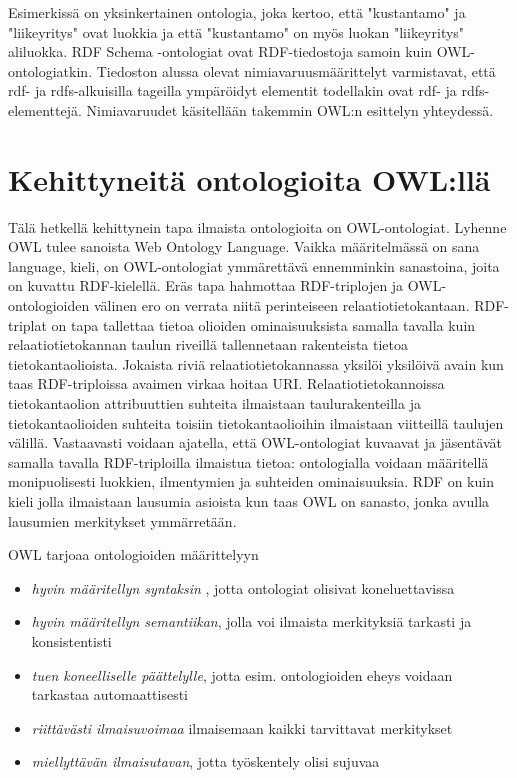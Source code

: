 \documentclass[finnish]{tktltiki2}
\theoremstyle{definition}
\theoremstyle{remark}
\begin{document}
Esimerkissä on yksinkertainen ontologia, joka kertoo, että "kustantamo" ja "liikeyritys" ovat luokkia ja että "kustantamo" on myös luokan "liikeyritys" aliluokka. RDF Schema  -ontologiat ovat RDF-tiedostoja samoin kuin OWL-ontologiatkin. Tiedoston alussa olevat nimiavaruusmäärittelyt varmistavat, että rdf- ja rdfs-alkuisilla tageilla ympäröidyt elementit todellakin ovat rdf- ja rdfs- elementtejä. Nimiavaruudet käsitellään takemmin OWL:n esittelyn yhteydessä. 

\section{Kehittyneitä ontologioita OWL:llä}



Tälä hetkellä kehittynein tapa ilmaista ontologioita on OWL-ontologiat. Lyhenne OWL tulee 
sanoista Web Ontology Language. Vaikka määritelmässä on sana language, kieli, on 
OWL-ontologiat ymmärettävä ennemminkin sanastoina, joita on kuvattu RDF-kielellä.
 Eräs tapa hahmottaa RDF-triplojen ja
OWL-ontologioiden välinen ero on verrata niitä perinteiseen
relaatiotietokantaan. RDF-triplat on tapa tallettaa tietoa olioiden ominaisuuksista samalla tavalla kuin
relaatiotietokannan taulun riveillä tallennetaan rakenteista tietoa tietokantaolioista. Jokaista riviä relaatiotietokannassa
yksilöi yksilöivä avain kun taas RDF-triploissa avaimen virkaa hoitaa URI. Relaatiotietokannoissa tietokantaolion attribuuttien suhteita ilmaistaan taulurakenteilla ja tietokantaolioiden suhteita toisiin tietokantaolioihin ilmaistaan viitteillä taulujen välillä. Vastaavasti voidaan ajatella, että OWL-ontologiat kuvaavat ja jäsentävät  samalla tavalla RDF-triploilla ilmaistua tietoa: ontologialla voidaan määritellä monipuolisesti luokkien, ilmentymien ja suhteiden ominaisuuksia.  RDF on kuin kieli jolla ilmaistaan lausumia asioista kun taas OWL on sanasto, jonka avulla lausumien merkitykset ymmärretään. 

OWL tarjoaa ontologioiden määrittelyyn \cite{AH09} 
\begin{itemize}
\item \textit{hyvin määritellyn syntaksin} , jotta ontologiat olisivat koneluettavissa
\item \textit{hyvin määritellyn semantiikan}, jolla voi ilmaista merkityksiä tarkasti ja konsistentisti
\item \textit{tuen koneelliselle päättelylle}, jotta esim.  ontologioiden eheys voidaan tarkastaa automaattisesti
\item \textit{riittävästi ilmaisuvoimaa} ilmaisemaan kaikki tarvittavat merkitykset
\item \textit{miellyttävän ilmaisutavan}, jotta työskentely olisi sujuvaa
\end{itemize}
\end{document}
